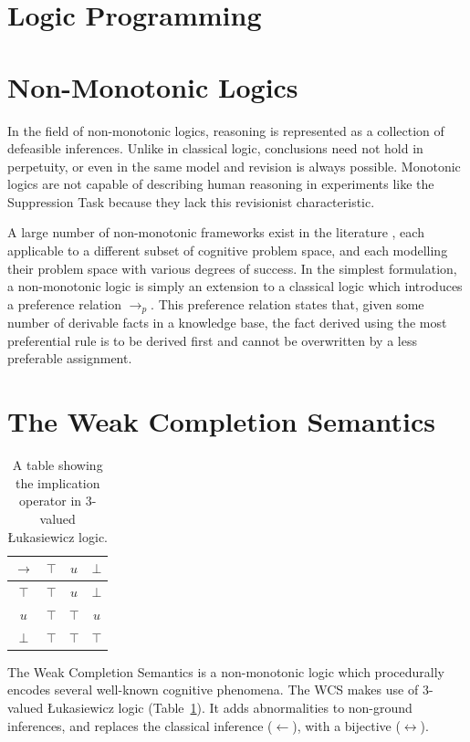\documentclass[
11pt, %
english, %
singlespacing, %
headsepline, %
]{MastersDoctoralThesis} %
\begin{document}
\section{Logic Programming}

\section{Non-Monotonic Logics}
In the field of non-monotonic logics, reasoning is represented as a collection of defeasible inferences. Unlike in classical logic, conclusions need not hold in perpetuity, or even in the same model and revision is always possible. Monotonic logics are not capable of describing human reasoning in experiments like the Suppression Task \citep{dietz2012computational} because they lack this revisionist characteristic.

A large number of non-monotonic frameworks exist in the literature \citep{mcdermott1980non}, each applicable to a different subset of cognitive problem space, and each modelling their problem space with various degrees of success. In the simplest formulation, a non-monotonic logic is simply an extension to a classical logic which introduces a preference relation $\rightarrow_p$. This preference relation states that, given some number of derivable facts in a knowledge base, the fact derived using the most preferential rule is to be derived first and cannot be overwritten by a less preferable assignment.  

\section{The Weak Completion Semantics}
\begin{table}
\begin{center}
\begin{tabular}{ c | c c c }
  $\rightarrow$& $\top$ & $u$ & $\bot$ \\ \hline
 $\top$ & $\top$ & $u$ & $\bot$ \\  
 $u$ & $\top$ & $\top$ & $u$\\  
 $\bot$ & $\top$ & $\top$ & $\top$
\end{tabular}
\caption{A table showing the implication operator in 3-valued \L ukasiewicz logic.}
\label{tbl:luk}
\end{center}
\end{table}

The Weak Completion Semantics is a non-monotonic logic which procedurally encodes several well-known cognitive phenomena. The WCS makes use of 3-valued \L ukasiewicz logic (Table~\ref{tbl:luk}). It adds abnormalities to non-ground inferences, and replaces the classical inference ($\leftarrow$), with a bijective ($\leftrightarrow$). 
\end{document}
